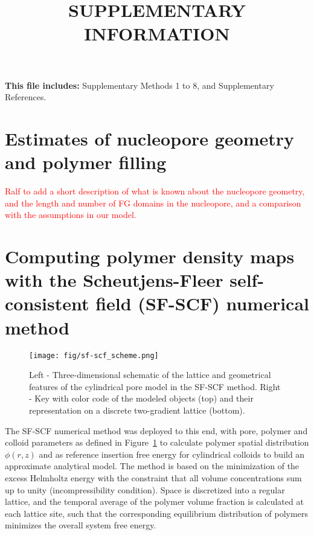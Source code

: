 \documentclass[10pt, a4paper, twocolumn]{article}
\title{SUPPLEMENTARY INFORMATION}
\author{}
\date{}
\newcommand\todo[1]{\textcolor{red}{#1}}
\begin{document}
\maketitle


\begin{center}
    \textbf{This file includes:} Supplementary Methods 1 to 8, and Supplementary References.
\end{center}
\twocolumn

\pagebreak
\section{Estimates of nucleopore geometry and polymer filling}

\todo{Ralf to add a short description of what is known about the nucleopore geometry, and the length and number of FG domains in the nucleopore, and a comparison with the assumptions in our model.}

\pagebreak
\section{Computing polymer density maps with the Scheutjens-Fleer self-consistent field (SF-SCF) numerical method}


\begin{figure}[h]
    \centering
    \texttt{[image: fig/sf-scf\_scheme.png]}
    \caption{
    Left - Three-dimensional schematic of the lattice and geometrical features of the cylindrical pore model in the SF-SCF method.
    Right - Key with color code of the modeled objects (top) and their representation on a discrete two-gradient lattice (bottom).
    }
    \label{fig:sf-scf_scheme}
\end{figure}


The SF-SCF numerical method was deployed to this end, with pore, polymer and colloid parameters as defined in Figure~\ref{fig:sf-scf_scheme} to calculate polymer spatial distribution $\phi(r,z)$ and as reference insertion free energy for cylindrical colloids to build an approximate analytical model.
The method is based on the minimization of the excess Helmholtz energy with the constraint that all volume concentrations sum up to unity (incompressibility condition).
Space is discretized into a regular lattice, and the temporal average of the polymer volume fraction is calculated at each lattice site, such that the corresponding equilibrium distribution of polymers minimizes the overall system free energy.
\end{document}
